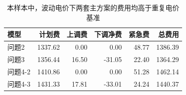 \begin{table}[H]
\centering\small
\caption{本样本中，波动电价下两套主方案的费用均高于重复电价基准}
\label{tab:annual}
\begin{tabular}{lrrrrr}\toprule
模型 & 计划费 & 上调费 & 下调净费 & 紧急费 & 总费用 \\\midrule
问题2 & 1337.62 & 0.00 & 0.00 & 48.77 & 1386.39 \\
问题3 & 1356.44 & 16.50 & -31.05 & 22.40 & 1364.29 \\
问题4-2 & 1410.86 & 0.00 & 0.00 & 51.28 & 1462.14 \\
问题4-3 & 1431.33 & 17.81 & -33.01 & 24.24 & 1440.37 \\
\bottomrule\end{tabular}
\end{table}
